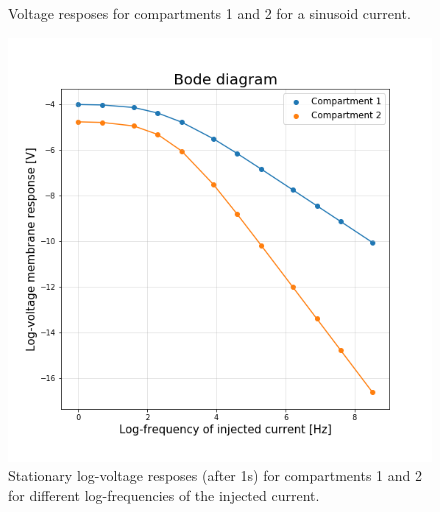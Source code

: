 \documentclass[12pt]{article}
\begin{document}
\begin{enumerate}
\begin{figure}[h]
    \caption{Voltage resposes for compartments 1 and 2 for a sinusoid current.}
\end{figure}
\begin{figure}[h]
    \centering
    \includegraphics[width=\textwidth]{Bode.png}
    \caption{Stationary log-voltage resposes (after 1s) for compartments 1 and 2 for different log-frequencies of the injected current.}
\end{figure}
\end{enumerate}
\end{document}
